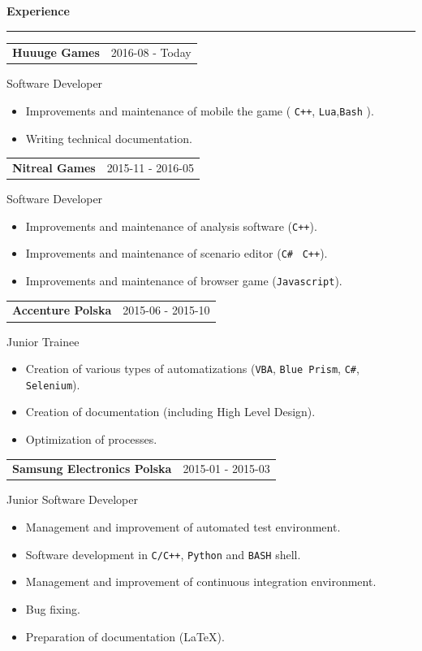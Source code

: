 \documentclass{article}
\newcommand{\header}[1] 
{
	\textbf{\large #1}
	\vspace{0.005\textheight}
	\hrule 
	\vspace{0.005\textheight}
}
\begin{document}
\header{Experience}

\begin{tabular}{@{} m{} R{0.37\textwidth} }
\textbf{Huuuge Games}	& {2016-08 - Today} 
\end{tabular}
Software Developer\\
\begin{itemize}
	\item Improvements and maintenance of mobile the game ( \texttt{C++}, \texttt{Lua},\texttt{Bash} ).
	\item Writing technical documentation.
	
\end{itemize}

\begin{tabular}{@{} m{} R{0.37\textwidth} }
\textbf{Nitreal Games}	& {2015-11 - 2016-05} 
\end{tabular}
Software Developer\\
\begin{itemize}
	\item Improvements and maintenance of analysis software (\texttt{C++}).
	\item Improvements and maintenance of scenario editor (\texttt{C\#} \ \texttt{C++}).
	\item Improvements and maintenance of browser game (\texttt{Javascript}).
\end{itemize}

\begin{tabular}{@{} m{} R{0.37\textwidth} }
\textbf{Accenture Polska}	& {2015-06 - 2015-10} 
\end{tabular}
Junior Trainee\\
\begin{itemize}
	\item Creation of various types of automatizations (\texttt{VBA}, \texttt{Blue Prism}, \texttt{C\#}, \texttt{Selenium}).
	\item Creation of documentation (including High Level Design).
	\item Optimization of processes. 
\end{itemize}

\begin{tabular}{@{} m{} R{0.37\textwidth} }
\textbf{Samsung Electronics Polska}	& {2015-01 - 2015-03} 
\end{tabular}
Junior Software Developer\\
\begin{itemize}
	\item Management and improvement of automated test environment.
	\item Software development in \texttt{C/C++}, \texttt{Python} and \texttt{BASH} shell.
	\item Management and improvement of continuous integration environment.
	\item Bug fixing.
	\item Preparation of documentation (\LaTeX).
\end{itemize}
\end{document}
